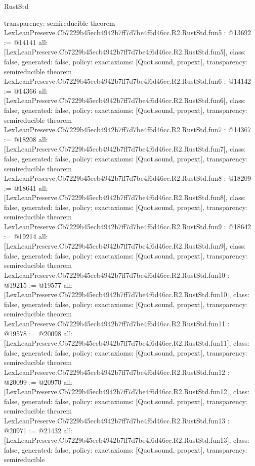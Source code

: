\begin{lexlean}{RustStd}
\begin{coremodule}
{  transparency: semireducible
}
theorem LexLeanPreserve.Cb7229b45ecb4942b7ff7d7be4f6d46cc.R2.RustStd.fun5 : @13692 := @14141 {
  all: [LexLeanPreserve.Cb7229b45ecb4942b7ff7d7be4f6d46cc.R2.RustStd.fun5],
  class: false,
  generated: false,
  policy: exact{axioms: [Quot.sound, propext]},
  transparency: semireducible
}
theorem LexLeanPreserve.Cb7229b45ecb4942b7ff7d7be4f6d46cc.R2.RustStd.fun6 : @14142 := @14366 {
  all: [LexLeanPreserve.Cb7229b45ecb4942b7ff7d7be4f6d46cc.R2.RustStd.fun6],
  class: false,
  generated: false,
  policy: exact{axioms: [Quot.sound, propext]},
  transparency: semireducible
}
theorem LexLeanPreserve.Cb7229b45ecb4942b7ff7d7be4f6d46cc.R2.RustStd.fun7 : @14367 := @18208 {
  all: [LexLeanPreserve.Cb7229b45ecb4942b7ff7d7be4f6d46cc.R2.RustStd.fun7],
  class: false,
  generated: false,
  policy: exact{axioms: [Quot.sound, propext]},
  transparency: semireducible
}
theorem LexLeanPreserve.Cb7229b45ecb4942b7ff7d7be4f6d46cc.R2.RustStd.fun8 : @18209 := @18641 {
  all: [LexLeanPreserve.Cb7229b45ecb4942b7ff7d7be4f6d46cc.R2.RustStd.fun8],
  class: false,
  generated: false,
  policy: exact{axioms: [Quot.sound, propext]},
  transparency: semireducible
}
theorem LexLeanPreserve.Cb7229b45ecb4942b7ff7d7be4f6d46cc.R2.RustStd.fun9 : @18642 := @19214 {
  all: [LexLeanPreserve.Cb7229b45ecb4942b7ff7d7be4f6d46cc.R2.RustStd.fun9],
  class: false,
  generated: false,
  policy: exact{axioms: [Quot.sound, propext]},
  transparency: semireducible
}
theorem LexLeanPreserve.Cb7229b45ecb4942b7ff7d7be4f6d46cc.R2.RustStd.fun10 : @19215 := @19577 {
  all: [LexLeanPreserve.Cb7229b45ecb4942b7ff7d7be4f6d46cc.R2.RustStd.fun10],
  class: false,
  generated: false,
  policy: exact{axioms: [Quot.sound, propext]},
  transparency: semireducible
}
theorem LexLeanPreserve.Cb7229b45ecb4942b7ff7d7be4f6d46cc.R2.RustStd.fun11 : @19578 := @20098 {
  all: [LexLeanPreserve.Cb7229b45ecb4942b7ff7d7be4f6d46cc.R2.RustStd.fun11],
  class: false,
  generated: false,
  policy: exact{axioms: [Quot.sound, propext]},
  transparency: semireducible
}
theorem LexLeanPreserve.Cb7229b45ecb4942b7ff7d7be4f6d46cc.R2.RustStd.fun12 : @20099 := @20970 {
  all: [LexLeanPreserve.Cb7229b45ecb4942b7ff7d7be4f6d46cc.R2.RustStd.fun12],
  class: false,
  generated: false,
  policy: exact{axioms: [Quot.sound, propext]},
  transparency: semireducible
}
theorem LexLeanPreserve.Cb7229b45ecb4942b7ff7d7be4f6d46cc.R2.RustStd.fun13 : @20971 := @21432 {
  all: [LexLeanPreserve.Cb7229b45ecb4942b7ff7d7be4f6d46cc.R2.RustStd.fun13],
  class: false,
  generated: false,
  policy: exact{axioms: [Quot.sound, propext]},
  transparency: semireducible
}
\end{coremodule}
\end{lexlean}
